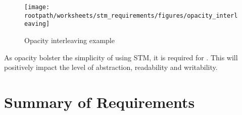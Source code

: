 \begin{figure}[htbp]
\centering
 \texttt{[image: \\rootpath/worksheets/stm\_requirements/figures/opacity\_interleaving]} 
 \caption{Opacity interleaving example}
\label{fig:opacity_interleaving}
\end{figure}

As opacity bolster the simplicity of using \ac{STM}, it is required for \stmname. This will positively impact the level of abstraction, readability and writability.

\section{Summary of Requirements}
\worksheetend
